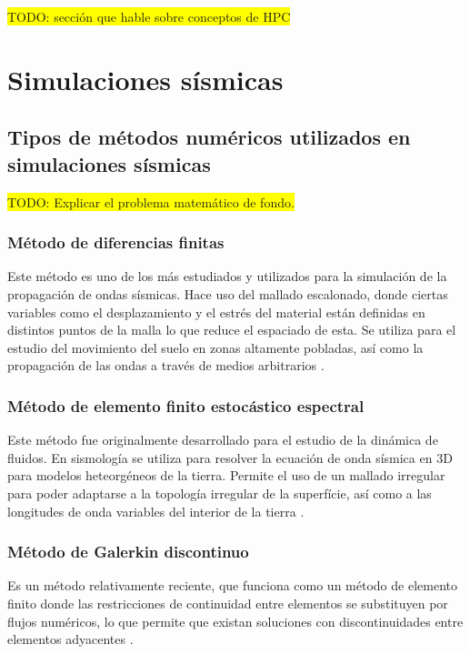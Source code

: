 \colorbox{yellow}{TODO: sección que hable sobre conceptos de HPC}
\section{Simulaciones sísmicas}
\subsection{Tipos de métodos numéricos utilizados en simulaciones sísmicas}
\colorbox{yellow}{TODO: Explicar el problema matemático de fondo.}
\subsubsection{Método de diferencias finitas}
Este método es uno de los más estudiados y utilizados para la simulación de la propagación de ondas sísmicas. Hace uso del mallado escalonado, donde ciertas variables como el desplazamiento y el estrés del material están definidas en distintos puntos de la malla lo que reduce el espaciado de esta. Se utiliza para el estudio del movimiento del suelo en zonas altamente pobladas, así como la propagación de las ondas a través de medios arbitrarios \cite{Fichtner2011}.
\subsubsection{Método de elemento finito estocástico espectral}
Este método fue originalmente desarrollado para el estudio de la dinámica de fluidos. En sismología se utiliza para resolver la ecuación de onda sísmica en 3D para modelos heteorgéneos de la tierra. Permite el uso de un mallado irregular para poder adaptarse a la topología irregular de la superfície, así como a las longitudes de onda variables del interior de la tierra \cite{Fichtner2011}.
\subsubsection{Método de Galerkin discontinuo}
  Es un método relativamente reciente, que funciona como un método de elemento finito donde las restricciones de continuidad entre elementos se substituyen por flujos numéricos, lo que permite que existan soluciones con discontinuidades entre elementos adyacentes \cite{Fichtner2011}.
